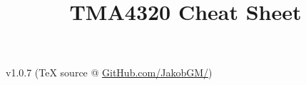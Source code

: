 \documentclass[6pt]{article}
\date{}
\title{TMA4320 Cheat Sheet}
\theoremstyle{definition}
\begin{document}
\begin{multicols*}{3}

\maketitle
v1.0.7 (TeX source @ \href{https://github.com/JakobGM/Numerical-Analysis-Cheat-Sheet}{GitHub.com/JakobGM/})






\end{multicols*}
\end{document}
